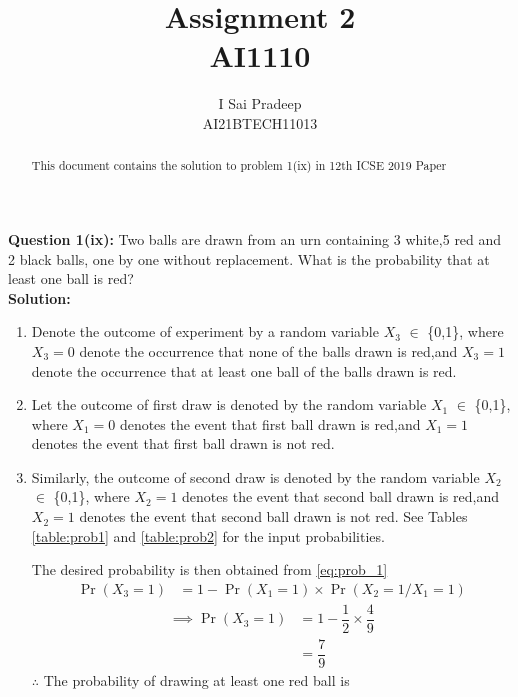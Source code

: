 \documentclass[journal,12pt,twocolumn]{IEEEtran}
\providecommand{\pr}[1]{\ensuremath{\Pr\left(#1\right)}}
\begin{document}
	\title{\huge{Assignment 2}\\AI1110}
	\author{\Large{I Sai Pradeep}\\AI21BTECH11013}
	\maketitle
	\begin{abstract}
		This document contains the solution to problem 1(ix) in 12th ICSE 2019 Paper
	\end{abstract}
	\noindent \textbf{Question 1(ix):}
	Two balls are drawn from an urn containing 3 white,5 red and 2 black balls, one by one without replacement. What is the probability that at least one ball is red?\\	
	\textbf{Solution:}
	\begin{enumerate}
		\item Denote the outcome of experiment by a random variable $X_3$ $\in$ \{0,1\}, where $X_3=0$ denote the occurrence that none of the balls drawn is red,and $X_3=1$ denote the occurrence that at least one ball of the balls drawn is red. 
		\item Let the outcome of first draw is denoted by the random variable $X_1$ $\in$ \{0,1\}, where $X_1=0$ denotes the event that first ball drawn is red,and $X_1=1$ denotes the event that first ball drawn is not red.
		\item  Similarly, the outcome of second draw is denoted by the random variable $X_2$ $\in$ \{0,1\}, where $X_2=1$ denotes the event that second ball drawn is red,and $X_2=1$ denotes the event that second ball drawn is not red. 
		See Tables 
		\eqref{table:prob1}
		and 
		\eqref{table:prob2} 
		for the input probabilities.
		\begin{table}[ht!]
			
			\vspace*{5pt}
			\caption{}
			\label{table:prob1}
		\end{table}
		\begin{table}[ht!]
			
			\vspace*{5pt}
			\caption{}
			\label{table:prob2}
		\end{table}
		The desired probability is then obtained from
		\eqref{eq:prob_1}
		\begin{align}
		\pr{X_3=1}&= 1-\pr{X_1=1} \times \pr{X_2=1/X_1 =1}
	    \label{eq:prob_1}
		\end{align}
		\begin{align}
			\implies \pr{X_3 = 1} &= 1-{{\dfrac{1}{2}} \times \dfrac{4}{9}}
			\\
			&= \dfrac{7}{9}
	    \end{align}
		$\therefore$ The probability of drawing at least one red ball is 
		
	\end{enumerate}
\end{document}
